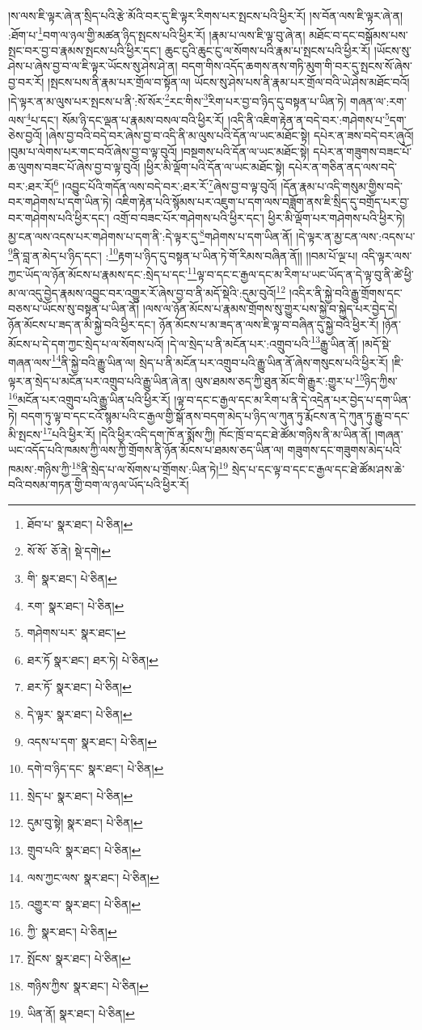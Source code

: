 །ས་ལས་ཇི་ལྟར་ཞེ་ན་སྲིད་པའི་རྩེ་མོའི་བར་དུ་ཇི་ལྟར་རིགས་པར་སྤངས་པའི་ཕྱིར་རོ། །ས་བོན་ལས་ཇི་ལྟར་ཞེ་ན། :ཐོག་པ་\footnote{ཐོབ་པ་  སྣར་ཐང་།  པེ་ཅིན། }བག་ལ་ཉལ་གྱི་མཚན་ཉིད་སྤངས་པའི་ཕྱིར་རོ། །རྣམ་པ་ལས་ཇི་ལྟ་བུ་ཞེ་ན། མཐོང་བ་དང་བསྒོམས་པས་སྤང་བར་བྱ་བ་རྣམས་སྤངས་པའི་ཕྱིར་དང་། ཆུང་ངུའི་ཆུང་ངུ་ལ་སོགས་པའི་རྣམ་པ་སྤངས་པའི་ཕྱིར་རོ། །ཡོངས་སུ་ཤེས་པ་ཞེས་བྱ་བ་ལ་ཇི་ལྟར་ཡོངས་སུ་ཤེས་ཤེ་ན། བདག་གིས་འདོད་ཆགས་ནས་གཏི་མུག་གི་བར་དུ་སྤངས་སོ་ཞེས་བྱ་བར་རོ། །སྤངས་པས་ནི་རྣམ་པར་གྲོལ་བ་སྟོན་ལ། ཡོངས་སུ་ཤེས་པས་ནི་རྣམ་པར་གྲོལ་བའི་ཡེ་ཤེས་མཐོང་བའོ། །དེ་ལྟར་ན་མ་ལུས་པར་སྤངས་པ་ནི་:སོ་སོར་\footnote{སོ་སོ་  ཅོ་ནེ།  སྡེ་དགེ། }རང་གིས་\footnote{གི་  སྣར་ཐང་།  པེ་ཅིན། }རིག་པར་བྱ་བ་ཉིད་དུ་བསྟན་པ་ཡིན་ཏེ། གཞན་ལ་:རག་ལས་\footnote{རག་  སྣར་ཐང་།  པེ་ཅིན། }པ་དང་། སོམ་ཉི་དང་ལྡན་པ་རྣམས་བསལ་བའི་ཕྱིར་རོ། །འདི་ནི་འཇིག་རྟེན་ན་བདེ་བར་:གཤེགས་པ་\footnote{གཤེགས་པར་  སྣར་ཐང་། }དག་ཅེས་བྱའོ། །ཞེས་བྱ་བའི་བདེ་བར་ཞེས་བྱ་བ་འདི་ནི་མ་ལུས་པའི་དོན་ལ་ཡང་མཐོང་སྟེ། དཔེར་ན་ཟས་བདེ་བར་ཞུའོ། །བུམ་པ་ལེགས་པར་གང་བའོ་ཞེས་བྱ་བ་ལྟ་བུའོ། །བསྔགས་པའི་དོན་ལ་ཡང་མཐོང་སྟེ། དཔེར་ན་གཟུགས་བཟང་པོ་ཆ་ལུགས་བཟང་པོ་ཞེས་བྱ་བ་ལྟ་བུའོ། །ཕྱིར་མི་ལྡོག་པའི་དོན་ལ་ཡང་མཐོང་སྟེ། དཔེར་ན་གཅིན་ནད་ལས་བདེ་བར་:ཐར་རོ།\footnote{ཐར་ཏོ  སྣར་ཐང་། ཐར་ཏེ།  པེ་ཅིན། } །འབྱུང་པོའི་གདོན་ལས་བདེ་བར་:ཐར་རོ་\footnote{ཐར་ཏོ་  སྣར་ཐང་།  པེ་ཅིན། }ཞེས་བྱ་བ་ལྟ་བུའོ། །དོན་རྣམ་པ་འདི་གསུམ་གྱིས་བདེ་བར་གཤེགས་པ་དག་ཡིན་ཏེ། འཇིག་རྟེན་པའི་སྙོམས་པར་འཇུག་པ་དག་ལས་བཟློག་ནས་ཇི་སྲིད་དུ་བགྲོད་པར་བྱ་བར་གཤེགས་པའི་ཕྱིར་དང་། འགྲོ་བ་བཟང་པོར་གཤེགས་པའི་ཕྱིར་དང་། ཕྱིར་མི་ལྡོག་པར་གཤེགས་པའི་ཕྱིར་ཏེ། མྱ་ངན་ལས་འདས་པར་གཤེགས་པ་དག་ནི་:དེ་ལྟར་དུ་\footnote{དེ་ལྟར་  སྣར་ཐང་།  པེ་ཅིན། }གཤེགས་པ་དག་ཡིན་ནོ། །དེ་ལྟར་ན་མྱ་ངན་ལས་:འདས་པ་\footnote{འདས་པ་དག་  སྣར་ཐང་།  པེ་ཅིན། }ནི་བླ་ན་མེད་པ་ཉིད་དང་། :\footnote{དགེ་བ་ཉིད་དང་  སྣར་ཐང་།  པེ་ཅིན། }རྟག་པ་ཉིད་དུ་བསྟན་པ་ཡིན་ཏེ་གོ་རིམས་བཞིན་ནོ།། །།བམ་པོ་ལྔ་པ། འདི་ལྟར་ལས་ཀྱང་ཡོད་ལ་ཉོན་མོངས་པ་རྣམས་དང་:སྲེད་པ་དང་\footnote{སྲེད་པ་  སྣར་ཐང་།  པེ་ཅིན། }ལྟ་བ་དང་ང་རྒྱལ་དང་མ་རིག་པ་ཡང་ཡོད་ན་དེ་ལྟ་བུ་ནི་ཚེ་ཕྱི་མ་ལ་འདུ་བྱེད་རྣམས་འབྱུང་བར་འགྱུར་རོ་ཞེས་བྱ་བ་ནི་མདོ་སྡེའི་:དུམ་བུའོ།\footnote{དུམ་བུ་སྟེ།  སྣར་ཐང་།  པེ་ཅིན། } །འདིར་ནི་སྐྱེ་བའི་རྒྱུ་གྲོགས་དང་བཅས་པ་ཡོངས་སུ་བསྟན་པ་ཡིན་ནོ། །ལས་ལ་ཉོན་མོངས་པ་རྣམས་གྲོགས་སུ་གྱུར་པས་སྐྱེ་བ་སྐྱེད་པར་བྱེད་དེ། ཉོན་མོངས་པ་ཟད་ན་མི་སྐྱེ་བའི་ཕྱིར་དང་། ཉོན་མོངས་པ་མ་ཟད་ན་ལས་ཇི་ལྟ་བ་བཞིན་དུ་སྐྱེ་བའི་ཕྱིར་རོ། །ཉོན་མོངས་པ་དེ་དག་ཀྱང་སྲེད་པ་ལ་སོགས་པའོ། །དེ་ལ་སྲེད་པ་ནི་མངོན་པར་:འགྲུབ་པའི་\footnote{གྲུབ་པའི་  སྣར་ཐང་།  པེ་ཅིན། }རྒྱུ་ཡིན་ནོ། །མདོ་སྡེ་གཞན་ལས་\footnote{ལས་ཀྱང་ལས་  སྣར་ཐང་།  པེ་ཅིན། }ནི་སྐྱེ་བའི་རྒྱུ་ཡིན་ལ། སྲེད་པ་ནི་མངོན་པར་འགྲུབ་པའི་རྒྱུ་ཡིན་ནོ་ཞེས་གསུངས་པའི་ཕྱིར་རོ། །ཇི་ལྟར་ན་སྲེད་པ་མངོན་པར་འགྲུབ་པའི་རྒྱུ་ཡིན་ཞེ་ན། ལུས་ཐམས་ཅད་ཀྱི་ཐུན་མོང་གི་རྒྱུར་:གྱུར་པ་\footnote{འགྱུར་བ་  སྣར་ཐང་།  པེ་ཅིན། }ཉིད་ཀྱིས་\footnote{ཀྱི་  སྣར་ཐང་།  པེ་ཅིན། }མངོན་པར་འགྲུབ་པའི་རྒྱུ་ཡིན་པའི་ཕྱིར་རོ། །ལྟ་བ་དང་ང་རྒྱལ་དང་མ་རིག་པ་ནི་དེ་འདྲེན་པར་བྱེད་པ་དག་ཡིན་ཏེ། བདག་ཏུ་ལྟ་བ་དང་ངའོ་སྙམ་པའི་ང་རྒྱལ་གྱི་སྒོ་ནས་བདག་མེད་པ་ཉིད་ལ་ཀུན་ཏུ་རྨོངས་ན་དེ་ཀུན་ཏུ་རྒྱུ་བ་དང་མི་སྤངས་\footnote{སྤོངས་  སྣར་ཐང་།  པེ་ཅིན། }པའི་ཕྱིར་རོ། །དེའི་ཕྱིར་འདི་དག་ཁོ་ན་སྨོས་ཀྱི། ཁོང་ཁྲོ་བ་དང་ཐེ་ཚོམ་གཉིས་ནི་མ་ཡིན་ནོ། །གཞན་ཡང་འདོད་པའི་ཁམས་ཀྱི་ལས་ཀྱི་གྲོགས་ནི་ཉོན་མོངས་པ་ཐམས་ཅད་ཡིན་ལ། གཟུགས་དང་གཟུགས་མེད་པའི་ཁམས་:གཉིས་ཀྱི་\footnote{གཉིས་ཀྱིས་  སྣར་ཐང་།  པེ་ཅིན། }ནི་སྲེད་པ་ལ་སོགས་པ་གྲོགས་:ཡིན་ཏེ།\footnote{ཡིན་ནོ།  སྣར་ཐང་།  པེ་ཅིན། } སྲེད་པ་དང་ལྟ་བ་དང་ང་རྒྱལ་དང་ཐེ་ཚོམ་ཤས་ཆེ་བའི་བསམ་གཏན་གྱི་བག་ལ་ཉལ་ཡོད་པའི་ཕྱིར་རོ། 